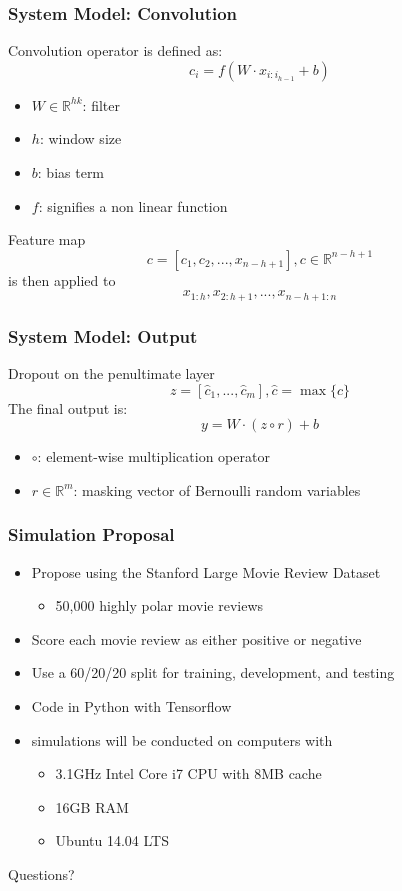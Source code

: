 \documentclass{beamer}
\begin{document}
\begin{frame}
\frametitle{System Model: Convolution}
    Convolution operator is defined as:
    $$c_i = f(W \cdot x_{i:i_{h-1}} + b)$$
    \begin{itemize}
        \item $W \in \mathbb{R}^{hk}$: filter
        \item $h$: window size
        \item $b$: bias term
        \item $f$: signifies a non linear function
    \end{itemize}
    Feature map
    $$c = [c_1, c_2, ... ,x_{n-h+1}], c \in \mathbb{R}^{n-h+1}$$
    is then applied to 
    $$x_{1:h}, x_{2:h+1}, ... ,x_{n-h+1:n}$$
\end{frame}

\begin{frame}
\frametitle{System Model: Output}
    Dropout on the penultimate layer 
    $$z = [\hat{c}_1,...,\hat{c}_m], \hat{c}=\operatorname{max}\{c\}$$
    The final output is:
    $$y = W \cdot (z \circ r) + b$$
    \begin{itemize}
    \item $\circ$: element-wise multiplication operator
    \item $r \in \mathbb{R}^m$: masking vector of Bernoulli random variables
    \end{itemize}
\end{frame}

\begin{frame}
\frametitle{Simulation Proposal}
    \begin{itemize}
        \item Propose using the Stanford Large Movie Review Dataset
        \begin{itemize}
            \item 50,000 highly polar movie reviews
        \end{itemize}
        \item Score each movie review as either positive or negative
        \item Use a 60/20/20 split for training, development, and testing
        \item Code in Python with Tensorflow
        \item simulations will be conducted on computers with 
        \begin{itemize}
            \item 3.1GHz Intel Core i7 CPU with 8MB cache
            \item 16GB RAM
            \item Ubuntu 14.04 LTS
        \end{itemize}
    \end{itemize}
\end{frame}

\begin{frame}
\center Questions?
\end{frame}
\end{document}
